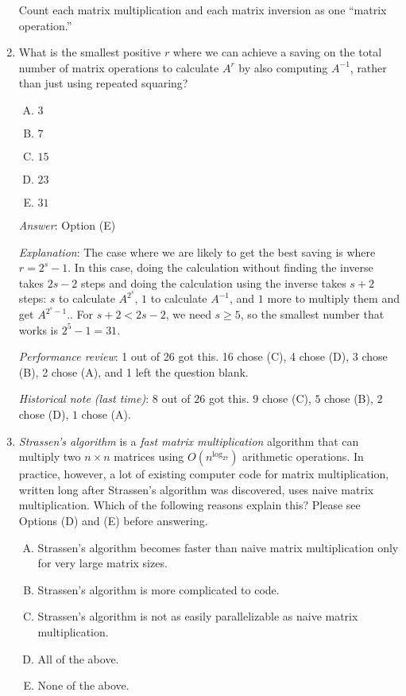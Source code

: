 \documentclass[10pt]{amsart}
\begin{document}
\begin{enumerate}
  Count each matrix multiplication and each matrix inversion as one
  ``matrix operation.''

\item What is the smallest positive $r$ where we can achieve a saving
  on the total number of matrix operations to calculate $A^r$ by also
  computing $A^{-1}$, rather than just using repeated squaring?

  \begin{enumerate}[(A)]
  \item $3$
  \item $7$
  \item $15$
  \item $23$
  \item $31$
  \end{enumerate}

  {\em Answer}: Option (E)

  {\em Explanation}: The case where we are likely to get the best
  saving is where $r = 2^s - 1$. In this case, doing the calculation
  without finding the inverse takes $2s - 2$ steps and doing the
  calculation using the inverse takes $s + 2$ steps: $s$ to calculate
  $A^{2^s}$, $1$ to calculate $A^{-1}$, and $1$ more to multiply them
  and get $A^{2^s - 1}$.. For $s + 2 < 2s - 2$, we need $s \ge 5$, so
  the smallest number that works is $2^5 - 1 = 31$.

  {\em Performance review}: 1 out of 26 got this. 16 chose (C), 4
  chose (D), 3 chose (B), 2 chose (A), and 1 left the question blank.

  {\em Historical note (last time)}: $8$ out of $26$ got this. $9$ chose (C),
  $5$ chose (B), $2$ chose (D), $1$ chose (A).
\item {\em Strassen's algorithm} is a {\em fast matrix multiplication}
  algorithm that can multiply two $n \times n$ matrices using
  $O(n^{\log_27})$ arithmetic operations. In practice, however, a lot
  of existing computer code for matrix multiplication, written long
  after Strassen's algorithm was discovered, uses naive matrix
  multiplication. Which of the following reasons explain this? Please
  see Options (D) and (E) before answering.

  \begin{enumerate}[(A)]
  \item Strassen's algorithm becomes faster than naive matrix
    multiplication only for very large matrix sizes.
  \item Strassen's algorithm is more complicated to code.
  \item Strassen's algorithm is not as easily parallelizable as naive
    matrix multiplication.
  \item All of the above.
  \item None of the above.
  \end{enumerate}


\end{enumerate}
\end{document}
